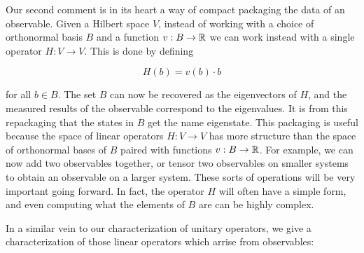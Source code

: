 \documentclass{article}
\theoremstyle{definition}
\numberwithin{figure}{section}
\begin{document}
Our second comment is in its heart a way of compact packaging the data of an observable. Given a Hilbert space $V$, instead of working with a choice of orthonormal basis $B$ and a function $v:B\to \mathbb{R}$ we can work instead with a single operator $H:V\to V$. This is done by defining

$$H(b)=v(b)\cdot b$$

for all $b\in B$. The set $B$ can now be recovered as the eigenvectors of $H$, and the measured results of the observable correspond to the eigenvalues. It is from this repackaging that the states in $B$ get the name eigenstate. This packaging is useful because the space of linear operators $H:V\to V$ has more structure than the space of orthonormal bases of $B$ paired with functions $v:B\to \mathbb{R}$. For example, we can now add two observables together, or tensor two observables on smaller systems to obtain an observable on a larger system. These sorts of operations will be very important going forward. In fact, the operator $H$ will often have a simple form, and even computing what the elements of $B$ are can be highly complex.

In a similar vein to our characterization of unitary operators, we give a characterization of those linear operators which arrise from observables:
\end{document}
